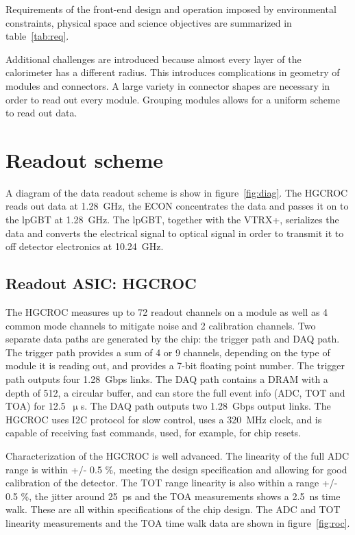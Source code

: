 \documentclass[twocolumn]{webofc}
\begin{document}
Requirements of the front-end design and operation imposed by environmental constraints, physical space and science objectives are summarized in table~\ref{tab:req}.

Additional challenges are introduced because almost every layer of the calorimeter has a different radius. This introduces complications in geometry of modules and connectors. A large variety in connector shapes are necessary in order to read out every module. Grouping modules allows for a uniform scheme to read out data.

\section{Readout scheme}
\label{sec:readout}

A diagram of the data readout scheme is show in figure~\ref{fig:diag}. The HGCROC reads out data at 1.28~GHz, the ECON concentrates the data and passes it on to the lpGBT at 1.28~GHz. The lpGBT, together with the VTRX+, serializes the data and converts the electrical signal to optical signal in order to transmit it to off detector electronics at 10.24~GHz.

\subsection{Readout ASIC: HGCROC}
\label{sec:roc}
The HGCROC measures up to 72 readout channels on a module as well as 4 common mode channels to mitigate noise and 2 calibration channels.
Two separate data paths are generated by the chip: the trigger path and DAQ path.
The trigger path provides a sum of 4 or 9 channels, depending on the type of module it is reading out, and provides a 7-bit floating point number. The trigger path outputs four 1.28~Gbps links. The DAQ path contains a DRAM with a depth of 512, a circular buffer, and can store the full event info (ADC, TOT and TOA) for 12.5~$\upmu$s. The DAQ path outputs two 1.28~Gbps output links. The HGCROC uses I2C protocol for slow control, uses a 320~MHz clock, and is capable of receiving fast commands, used, for example, for chip resets.

Characterization of the HGCROC is well advanced. The linearity of the full ADC range is within +/- 0.5 \%, meeting the design specification and allowing for good calibration of the detector. The TOT range linearity is also within a range +/- 0.5 \%, the jitter around 25~ps and the TOA measurements shows a 2.5~ns time walk. These are all within specifications of the chip design. The ADC and TOT linearity measurements and the TOA time walk data are shown in figure~\ref{fig:roc}.
\end{document}
